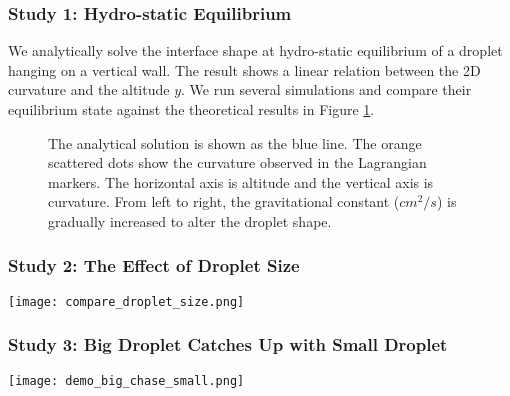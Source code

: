 \documentclass{jfm}
\begin{document}
    \subsubsection {Study 1: Hydro-static Equilibrium}
        We analytically solve the interface shape at hydro-static equilibrium of a droplet hanging on a vertical wall. The result shows a linear relation between the 2D curvature and the altitude $y$. We run several simulations and compare their equilibrium state against the theoretical results in Figure \ref{fig:h-curvature}. 
        \begin{figure} \label{fig:h-curvature} 
        \small 
        The analytical solution is shown as the blue line. The orange scattered dots show the curvature observed in the Lagrangian markers. The horizontal axis is altitude and the vertical axis is curvature. From left to right, the gravitational constant ($cm^2/s$) is gradually increased to alter the droplet shape.
        \end{figure}
    \subsubsection {Study 2: The Effect of Droplet Size}
        {\centering
            \texttt{[image: compare\_droplet\_size.png]}
            \par
        }
    \subsubsection {Study 3: Big Droplet Catches Up with Small Droplet}
        {\centering
            \texttt{[image: demo\_big\_chase\_small.png]}
            \par
        }
\end{document}

